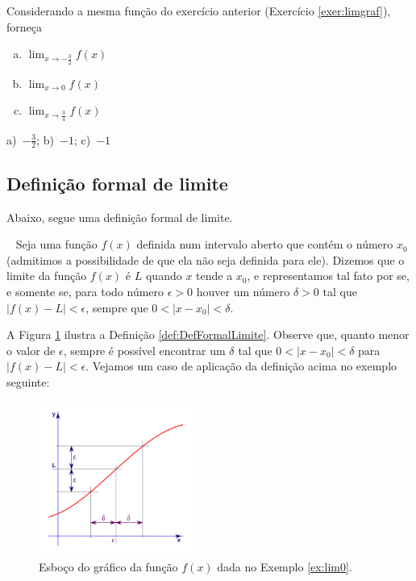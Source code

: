\cleardoublepage\documentclass[../main.tex]{subfiles}
\begin{document}
\begin{exer}
  Considerando a mesma função do exercício anterior (Exercício \ref{exer:limgraf}), forneça
  \begin{multicols}{2}
  \begin{enumerate}[a)]
  \item $\displaystyle \lim_{x\to -\frac{3}{2}} f(x)$
  \item $\displaystyle \lim_{x\to 0} f(x)$
  \item $\displaystyle \lim_{x\to \frac{3}{4}} f(x)$
  \end{enumerate}\end{multicols}
\end{exer}
\begin{resp}
  a)~$-\frac{3}{2}$; b)~$-1$; c)~$-1$
\end{resp}

\subsection{Definição formal de limite}
Abaixo, segue uma definição formal de limite.
\begin{framed}
  \begin{definition}~\label{def:DefFormalLimite}
  Seja uma função $f(x)$ definida num intervalo aberto que contém o número $x_0$
(admitimos a possibilidade de que ela não seja definida para ele). Dizemos que 
o limite da função $f(x)$ é $L$ quando $x$ tende a $x_0$, e representamos tal fato por
se, e somente se, para todo número $\epsilon > 0$ houver um número $\delta  > 0$ tal que 
 $|f(x)-L|<\epsilon$,  sempre que $0<|x-x_0|<\delta$. 
  \end{definition}
\end{framed}

A Figura \ref{fig:DefFormalLimite} ilustra a Definição \ref{def:DefFormalLimite}. Observe que, quanto menor o valor de $\epsilon$, sempre é possível encontrar um $\delta$ tal que $0<|x-x_0|<\delta$ para $|f(x)-L|<\epsilon$. Vejamos um caso de aplicação da definição acima no exemplo seguinte:
 \begin{figure}[H]
    \centering
    \includegraphics[width=0.45\textwidth]{fig_lim/DefLimiteFormal}
    \caption{Esboço do gráfico da função $f(x)$ dada no Exemplo \ref{ex:lim0}.}
    \label{fig:DefFormalLimite}
  \end{figure}
\end{document}
